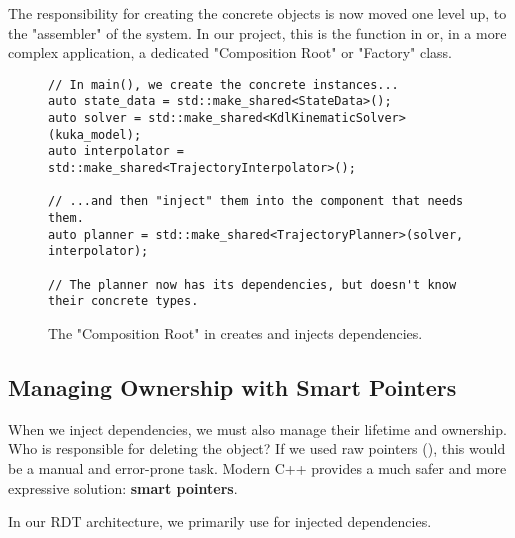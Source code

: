 The responsibility for creating the concrete objects is now moved one level up, to the "assembler" of the system. In our project, this is the  function in  or, in a more complex application, a dedicated "Composition Root" or "Factory" class.




\begin{figure}[H]
\captionsetup{type=lstlisting}
\setlength{\abovecaptionskip}{-15pt}
\begin{verbatim}
// In main(), we create the concrete instances...
auto state_data = std::make_shared<StateData>();
auto solver = std::make_shared<KdlKinematicSolver>(kuka_model);
auto interpolator = std::make_shared<TrajectoryInterpolator>();

// ...and then "inject" them into the component that needs them.
auto planner = std::make_shared<TrajectoryPlanner>(solver, interpolator);

// The planner now has its dependencies, but doesn't know their concrete types.
\end{verbatim}
\caption{The "Composition Root" in  creates and injects dependencies.}
\label{lst:composition-root}
\end{figure}

\subsection{Managing Ownership with Smart Pointers}
\label{subsec:di_ownership}

When we inject dependencies, we must also manage their lifetime and ownership. Who is responsible for deleting the  object? If we used raw pointers (), this would be a manual and error-prone task. Modern C++ provides a much safer and more expressive solution: \textbf{smart pointers}.

In our RDT architecture, we primarily use  for injected dependencies.

